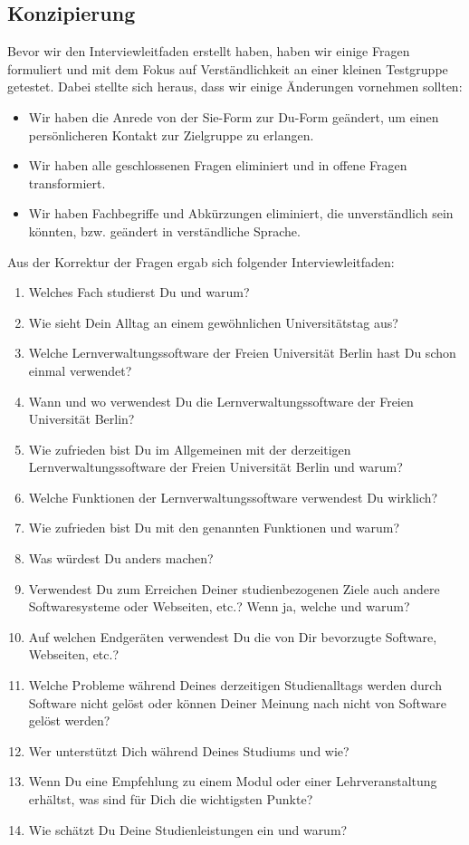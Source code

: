 \documentclass{article}
\begin{document}
\newpage

\subsection{Konzipierung}

Bevor wir den Interviewleitfaden erstellt haben, haben wir einige Fragen formuliert und mit dem Fokus auf Verständlichkeit an einer kleinen Testgruppe getestet. Dabei stellte sich heraus, dass wir einige Änderungen vornehmen sollten:
\begin{itemize}
\item Wir haben die Anrede von der Sie-Form zur Du-Form geändert, um einen persönlicheren Kontakt zur Zielgruppe zu erlangen.
\item Wir haben alle geschlossenen Fragen eliminiert und in offene Fragen transformiert.
\item Wir haben Fachbegriffe und Abkürzungen eliminiert, die unverständlich sein könnten, bzw. geändert in verständliche Sprache.
\end{itemize}
Aus der Korrektur der Fragen ergab sich folgender Interviewleitfaden:
\begin{enumerate}
\item Welches Fach studierst Du und warum?
\item Wie sieht Dein Alltag an einem gewöhnlichen Universitätstag aus?
\item Welche Lernverwaltungssoftware der Freien Universität Berlin hast Du schon einmal verwendet?
\item Wann und wo verwendest Du die Lernverwaltungssoftware der Freien Universität Berlin?
\item Wie zufrieden bist Du im Allgemeinen mit der derzeitigen Lernverwaltungssoftware der Freien Universität Berlin und warum?
\item Welche Funktionen der Lernverwaltungssoftware verwendest Du wirklich?
\item Wie zufrieden bist Du mit den genannten Funktionen und warum?
\item Was würdest Du anders machen?
\item Verwendest Du zum Erreichen Deiner studienbezogenen Ziele auch andere Softwaresysteme oder Webseiten, etc.? Wenn ja, welche und warum?
\item Auf welchen Endgeräten verwendest Du die von Dir bevorzugte Software, Webseiten, etc.?
\item Welche Probleme während Deines derzeitigen Studienalltags werden durch Software nicht gelöst oder können Deiner Meinung nach nicht von Software gelöst werden?
\item Wer unterstützt Dich während Deines Studiums und wie?
\item Wenn Du eine Empfehlung zu einem Modul oder einer Lehrveranstaltung erhältst, was sind für Dich die wichtigsten Punkte?
\item Wie schätzt Du Deine Studienleistungen ein und warum?
\end{enumerate}
\end{document}
